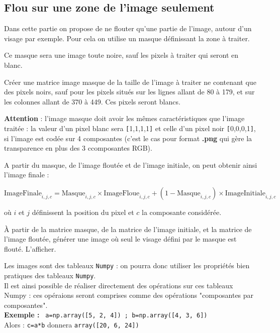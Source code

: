 \subsection*{Flou sur une zone de l'image seulement}
Dans cette partie on propose de ne flouter qu'une partie de l'image, autour d'un visage par exemple. Pour cela on utilise un masque définissant la zone à traiter.

Ce masque sera une image toute noire, sauf les pixels à traiter qui seront en blanc.

\begin{question}
Créer une matrice image masque de la taille de l'image à traiter ne contenant que des pixels noirs, sauf pour les pixels situés sur les lignes allant de 80 à 179, et sur les colonnes allant de 370  à 449. Ces pixels seront blancs.
\end{question}

\textbf{Attention} : l'image masque doit avoir les mêmes caractéristiques que l'image traitée : la valeur d'un pixel blanc sera \verb![!1,1,1,1\verb!]! et celle d'un pixel noir \verb![!0,0,0,1\verb!]!, si l'image est codée sur 4 composantes (c'est le cas pour format \textbf{.png} qui gère la transparence en plus des 3 ccomposantes RGB).

A partir du masque, de l'image floutée et de l'image initiale, on peut obtenir ainsi l'image finale :

$$\text{ImageFinale}_{i,j,c} = \text{Masque}_{i,j,c} \times \text{ImageFloue}_{i,j,c}  + (1-\text{Masque}_{i,j,c}) \times \text{ImageInitiale}_{i,j,c}$$  

où $i$ et $j$ définissent la position du pixel et $c$ la composante considérée.

\begin{question}
À partir de la matrice masque, de la matrice de l'image initiale, et la matrice de l'image floutée, générer une image où seul le visage défini par le masque est flouté. L'afficher.
\end{question}

\begin{remarque}
Les images sont des tableaux \texttt{Numpy} : on pourra donc utiliser les propriétés bien pratiques des tableaux \texttt{Numpy}.\\
Il est ainsi possible de réaliser directement des opérations sur ces tableaux Numpy :  ces opéraions seront comprises comme des opérations "composantes par composantes".\\
\textbf{Exemple :} \texttt{ a=np.array([5, 2, 4]) ; b=np.array([4, 3, 6])}     \\
       Alors  : \texttt{c=a*b} donnera \texttt{array([20, 6, 24])} 

\end{remarque}


